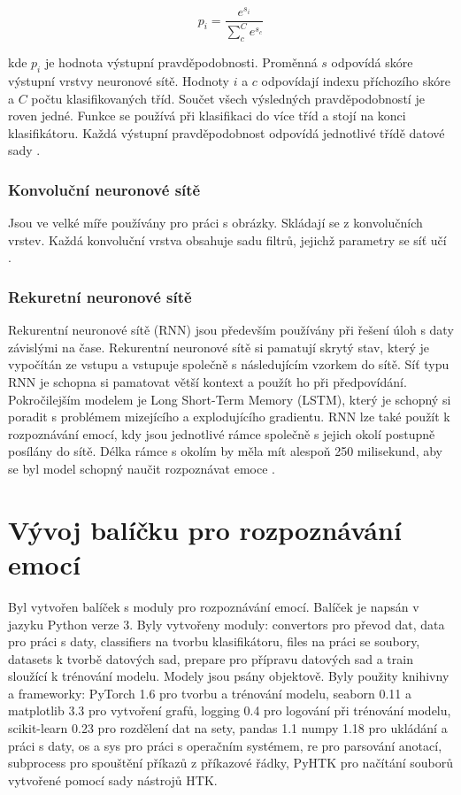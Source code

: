 \documentclass[FM,BP]{tulthesis}
\begin{document}
\begin{equation}
\label{eqn:softmax}
p_i = \frac{e^{s_i}}{\sum_{c}^{C}e^{s_c}}
\end{equation}

kde $ p_i $ je hodnota výstupní pravděpodobnosti. Proměnná $ s $ odpovídá skóre výstupní vrstvy neuronové sítě. Hodnoty $ i $ a $ c $ odpovídají indexu příchozího skóre a $ C $ počtu klasifikovaných tříd. Součet všech výsledných pravděpodobností je roven jedné. Funkce se používá při klasifikaci do více tříd a stojí na konci klasifikátoru. Každá výstupní pravděpodobnost odpovídá jednotlivé třídě datové sady \cite{brownlee_2020_Softmax}.

\subsection{Konvoluční neuronové sítě}
Jsou ve velké míře používány pro práci s obrázky. Skládají se z konvolučních vrstev. Každá konvoluční vrstva obsahuje sadu filtrů, jejichž parametry se síť učí \cite{DBLP:journals/corr/abs-1912-10458}.

\subsection{Rekuretní neuronové sítě}
Rekurentní neuronové sítě (RNN) jsou především používány při řešení úloh s daty závislými na čase. Rekurentní neuronové sítě si pamatují skrytý stav, který je vypočítán ze vstupu a vstupuje společně s následujícím vzorkem do sítě. Síť typu RNN je schopna si pamatovat větší kontext a použít ho při předpovídání. Pokročilejším modelem je Long Short-Term Memory (LSTM), který je schopný si poradit s problémem mizejícího a explodujícího gradientu. RNN lze také použít k rozpoznávání emocí, kdy jsou jednotlivé rámce společně s jejich okolí postupně posílány do sítě. Délka rámce s okolím by měla mít alespoň 250 milisekund, aby se byl model schopný naučit rozpoznávat emoce \cite{DBLP:journals/corr/abs-1912-10458}.

\chapter{Vývoj balíčku pro rozpoznávání emocí}
Byl vytvořen balíček s moduly pro rozpoznávání emocí. Balíček je napsán v jazyku Python verze 3. Byly vytvořeny moduly: convertors pro převod dat, data pro práci s daty, classifiers na tvorbu klasifikátoru, files na práci se soubory, datasets k tvorbě datových sad, prepare pro přípravu datových sad a train sloužící k trénování modelu. Modely jsou psány objektově. Byly použity knihivny a frameworky: PyTorch 1.6 pro tvorbu a trénování modelu, seaborn 0.11 a matplotlib 3.3 pro vytvoření grafů, logging 0.4 pro logování při trénování modelu, scikit-learn 0.23 pro rozdělení dat na sety, pandas 1.1 numpy 1.18 pro ukládání a práci s daty, os a sys pro práci s operačním systémem, re pro parsování anotací, subprocess pro spouštění příkazů z příkazové řádky, PyHTK pro načítání souborů vytvořené pomocí sady nástrojů HTK.
\end{document}
